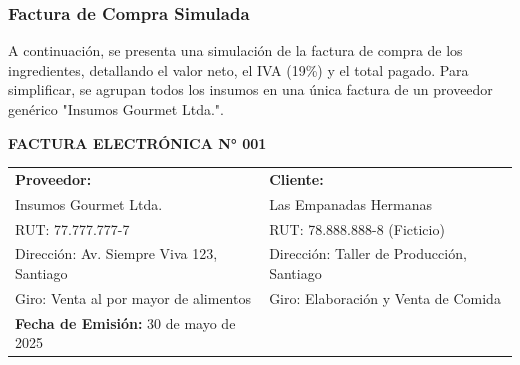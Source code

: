 \documentclass[12pt]{article}
\begin{document}
        \subsubsection{Factura de Compra Simulada}
        A continuación, se presenta una simulación de la factura de compra de los ingredientes, detallando el valor neto, el IVA (19\%) y el total pagado. Para simplificar, se agrupan todos los insumos en una única factura de un proveedor genérico "Insumos Gourmet Ltda.".

        \begin{table}[H]
            \centering
            \small
            \textbf{FACTURA ELECTRÓNICA N° 001} \\ %
            \begin{tabular}{|p{8cm}|p{6cm}|}
                \hline
                \textbf{Proveedor:} & \textbf{Cliente:} \\
                Insumos Gourmet Ltda. & Las Empanadas Hermanas \\
                RUT: 77.777.777-7 & RUT: 78.888.888-8 (Ficticio) \\
                Dirección: Av. Siempre Viva 123, Santiago & Dirección: Taller de Producción, Santiago \\
                Giro: Venta al por mayor de alimentos & Giro: Elaboración y Venta de Comida \\
                \hline
                \textbf{Fecha de Emisión:} 30 de mayo de 2025 & \\
                \hline
            \end{tabular}
            \vspace{0.3cm}
            

\end{table}
\end{document}
